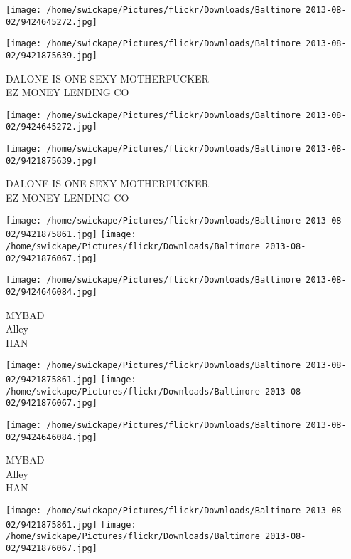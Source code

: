 \documentclass[10pt,letterpaper]{article}
\begin{document}
\texttt{[image: /home/swickape/Pictures/flickr/Downloads/Baltimore 2013-08-02/9424645272.jpg]}

\vspace{0.25in}
\texttt{[image: /home/swickape/Pictures/flickr/Downloads/Baltimore 2013-08-02/9421875639.jpg]}

DALONE IS ONE SEXY MOTHERFUCKER\\
EZ MONEY LENDING CO\\
\pagebreak

\texttt{[image: /home/swickape/Pictures/flickr/Downloads/Baltimore 2013-08-02/9424645272.jpg]}

\vspace{0.25in}
\texttt{[image: /home/swickape/Pictures/flickr/Downloads/Baltimore 2013-08-02/9421875639.jpg]}

DALONE IS ONE SEXY MOTHERFUCKER\\
EZ MONEY LENDING CO\\
\pagebreak

\texttt{[image: /home/swickape/Pictures/flickr/Downloads/Baltimore 2013-08-02/9421875861.jpg]}
\texttt{[image: /home/swickape/Pictures/flickr/Downloads/Baltimore 2013-08-02/9421876067.jpg]}

\texttt{[image: /home/swickape/Pictures/flickr/Downloads/Baltimore 2013-08-02/9424646084.jpg]}

MYBAD\\
Alley\\
HAN\\
\pagebreak

\texttt{[image: /home/swickape/Pictures/flickr/Downloads/Baltimore 2013-08-02/9421875861.jpg]}
\texttt{[image: /home/swickape/Pictures/flickr/Downloads/Baltimore 2013-08-02/9421876067.jpg]}

\texttt{[image: /home/swickape/Pictures/flickr/Downloads/Baltimore 2013-08-02/9424646084.jpg]}

MYBAD\\
Alley\\
HAN\\
\pagebreak

\texttt{[image: /home/swickape/Pictures/flickr/Downloads/Baltimore 2013-08-02/9421875861.jpg]}
\texttt{[image: /home/swickape/Pictures/flickr/Downloads/Baltimore 2013-08-02/9421876067.jpg]}
\end{document}
